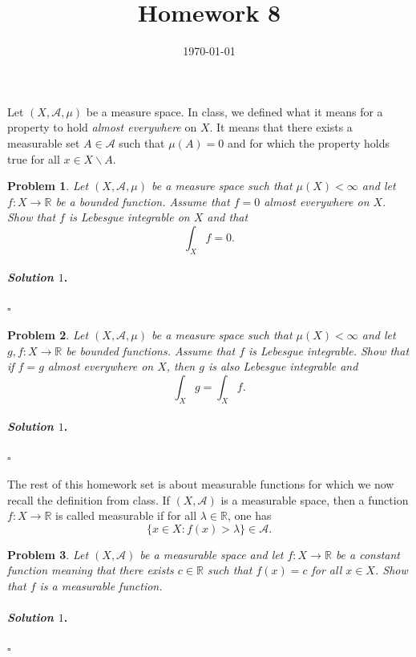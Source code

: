 \documentclass[reqno]{amsart}
\theoremstyle{plain}
\newtheorem{problem}{Problem}
\theoremstyle{definition}
\newenvironment{solution1}{\paragraph{\emph{Solution $1$}.}}{\hfill$\square$}
\begin{document}
 

\title[Homework 8]{Homework 8}

\date{\today} 
\maketitle 

Let $(X,\mathcal{A},\mu)$ be a measure space.  In class, we defined what it means for a property to hold \emph{almost everywhere} on $X$.  It means that there exists a measurable set $A \in \mathcal{A}$ such that $\mu(A) = 0$ and for which the property holds true for all $x \in X \smallsetminus A$.

\begin{problem}
Let $(X,\mathcal{A},\mu)$ be a measure space such that $\mu(X)<\infty$ and let $f:X \rightarrow \mathbb{R}$ be a bounded function.  Assume that $f = 0$ almost everywhere on $X$.  Show that $f$ is Lebesgue integrable on $X$ and that
$$\int_{X}f = 0. $$
\end{problem}
\begin{solution1}

\end{solution1}

\begin{problem}
Let $(X,\mathcal{A},\mu)$ be a measure space such that $\mu(X)<\infty$ and let $g,f:X \rightarrow \mathbb{R}$ be bounded functions.  Assume that $f$ is Lebesgue integrable.  Show that if $f = g$ almost everywhere on $X$, then $g$ is also Lebesgue integrable and
$$\int_{X}g = \int_{X}f. $$
\end{problem}
\begin{solution1}

\end{solution1}

The rest of this homework set is about measurable functions for which we now recall the definition from class.  If $(X,\mathcal{A})$ is a measurable space, then a function $f:X \rightarrow \mathbb{R}$ is called measurable if for all $\lambda \in \mathbb{R}$, one has
$$\{x \in X : f(x) > \lambda\} \in \mathcal{A}. $$

\begin{problem}
Let $(X,\mathcal{A})$ be a measurable space and let $f:X \rightarrow \mathbb{R}$ be a constant function meaning that there exists $c \in \mathbb{R}$ such that $f(x) = c$ for all $x \in X$.  Show that $f$ is a measurable function.
\end{problem}
\begin{solution1}

\end{solution1}
\end{document}
